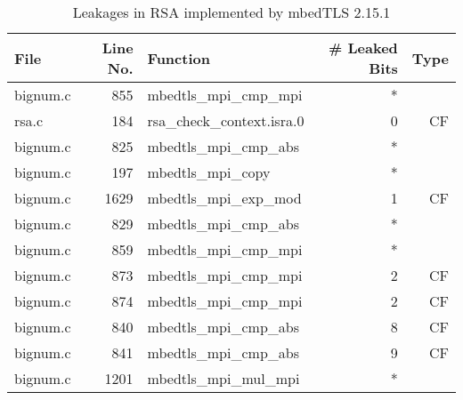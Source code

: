 \begin{table}[h!]
\centering\tiny\scriptsize
\caption{Leakages in RSA implemented by mbedTLS 2.15.1}\label{tab:RSAmbedTLS2.15.1}
\begin{tabular}{lrlrr}
\hline
\textbf{File} & \textbf{Line No.} & \textbf{Function} & \textbf{\# Leaked Bits} & \textbf{Type} \\\hline
bignum.c& 855&mbedtls\_mpi\_cmp\_mpi&*&\\
rsa.c& 184&rsa\_check\_context.isra.0&0 &CF\\
bignum.c& 825&mbedtls\_mpi\_cmp\_abs&*&\\
bignum.c& 197&mbedtls\_mpi\_copy&*&\\
bignum.c& 1629&mbedtls\_mpi\_exp\_mod&1 &CF\\
bignum.c& 829&mbedtls\_mpi\_cmp\_abs&*&\\
bignum.c& 859&mbedtls\_mpi\_cmp\_mpi&*&\\
bignum.c& 873&mbedtls\_mpi\_cmp\_mpi&2 &CF\\
bignum.c& 874&mbedtls\_mpi\_cmp\_mpi&2 &CF\\
bignum.c& 840&mbedtls\_mpi\_cmp\_abs&8 &CF\\
bignum.c& 841&mbedtls\_mpi\_cmp\_abs&9 &CF\\
bignum.c& 1201&mbedtls\_mpi\_mul\_mpi&*&\\
\hline
\end{tabular}
\renewcommand{\baselinestretch}{1.0}\selectfont
\end{table}
